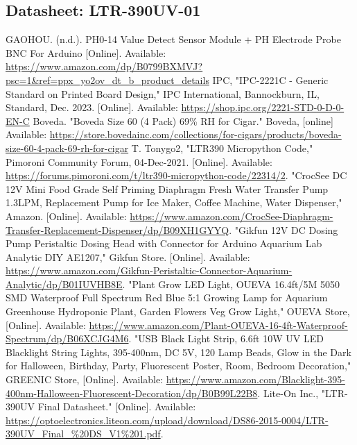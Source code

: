 \documentclass[12pt]{article} %
\begin{document}
\subsection{Datasheet: LTR-390UV-01}
\label{appendix:ltr390}

\pagebreak
\begin{thebibliography}{99}
     GAOHOU. (n.d.). PH0-14 Value Detect Sensor Module + PH Electrode Probe BNC For Arduino [Online]. Available: \url{https://www.amazon.com/dp/B0799BXMVJ?psc=1&ref=ppx_yo2ov_dt_b_product_details}
     IPC, "IPC-2221C - Generic Standard on Printed Board Design," IPC International, Bannockburn, IL, Standard, Dec. 2023. [Online]. Available: \url{https://shop.ipc.org/2221-STD-0-D-0-EN-C}
     Boveda. "Boveda Size 60 (4 Pack) 69\% RH for Cigar." Boveda, [online] Available: \url{https://store.bovedainc.com/collections/for-cigars/products/boveda-size-60-4-pack-69-rh-for-cigar} 
     T. Tonygo2, "LTR390 Micropython Code," Pimoroni Community Forum, 04-Dec-2021. [Online]. Available: \url{https://forums.pimoroni.com/t/ltr390-micropython-code/22314/2}.
     "CrocSee DC 12V Mini Food Grade Self Priming Diaphragm Fresh Water Transfer Pump 1.3LPM, Replacement Pump for Ice Maker, Coffee Machine, Water Dispenser," Amazon. [Online]. Available: \url{https://www.amazon.com/CrocSee-Diaphragm-Transfer-Replacement-Dispenser/dp/B09XH1GYYQ}. 
     "Gikfun 12V DC Dosing Pump Peristaltic Dosing Head with Connector for Arduino Aquarium Lab Analytic DIY AE1207," Gikfun Store. [Online]. Available: \url{https://www.amazon.com/Gikfun-Peristaltic-Connector-Aquarium-Analytic/dp/B01IUVHB8E}. 
     "Plant Grow LED Light, OUEVA 16.4ft/5M 5050 SMD Waterproof Full Spectrum Red Blue 5:1 Growing Lamp for Aquarium Greenhouse Hydroponic Plant, Garden Flowers Veg Grow Light," OUEVA Store, [Online]. Available: \url{https://www.amazon.com/Plant-OUEVA-16-4ft-Waterproof-Spectrum/dp/B06XCJG4M6}.
     "USB Black Light Strip, 6.6ft 10W UV LED Blacklight String Lights, 395-400nm, DC 5V, 120 Lamp Beads, Glow in the Dark for Halloween, Birthday, Party, Fluorescent Poster, Room, Bedroom Decoration," GREENIC Store, [Online]. Available: \url{https://www.amazon.com/Blacklight-395-400nm-Halloween-Fluorescent-Decoration/dp/B0B99L22B8}.
     Lite-On Inc., "LTR-390UV Final Datasheet." [Online]. Available: \url{https://optoelectronics.liteon.com/upload/download/DS86-2015-0004/LTR-390UV_Final_%20DS_V1%201.pdf}.

\end{thebibliography}
\end{document}

